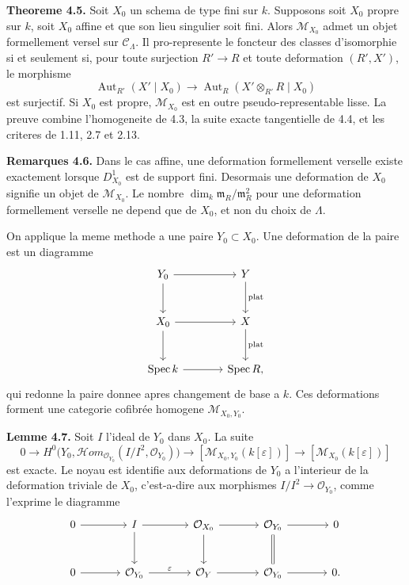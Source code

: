 \documentclass[11pt]{article}
\providecommand{\Spec}{\operatorname{Spec}}
\providecommand{\Aut}{\operatorname{Aut}}
\begin{document}
\textbf{Theoreme 4.5.} Soit \(X_0\) un schema de type fini sur \(k\). Supposons soit \(X_0\) propre sur \(k\), soit \(X_0\) affine et que son lieu singulier soit fini. Alors \(\mathcal M_{X_0}\) admet un objet formellement versel sur \(\mathcal C_\Lambda\). Il pro-represente le foncteur des classes d'isomorphie si et seulement si, pour toute surjection \(R'\to R\) et toute deformation \((R',X')\), le morphisme
\[
 \Aut_{R'}(X'\mid X_0)\to \Aut_R(X'\otimes_{R'}R\mid X_0)
\]
est surjectif. Si \(X_0\) est propre, \(\mathcal M_{X_0}\) est en outre pseudo-representable lisse. La preuve combine l'homogeneite de 4.3, la suite exacte tangentielle de 4.4, et les criteres de 1.11, 2.7 et 2.13.

\textbf{Remarques 4.6.} Dans le cas affine, une deformation formellement verselle existe exactement lorsque \(D^1_{X_0}\) est de support fini. Desormais une deformation de \(X_0\) signifie un objet de \(\mathcal M_{X_0}\). Le nombre \(\dim_k\mathfrak m_R/\mathfrak m_R^2\) pour une deformation formellement verselle ne depend que de \(X_0\), et non du choix de \(\Lambda\).

On applique la meme methode a une paire \(Y_0\subset X_0\). Une deformation de la paire est un diagramme
\[
\begin{tikzcd}[column sep=large,row sep=large]
 Y_0 \arrow[r] \arrow[d] & Y \arrow[d,"\mathrm{plat}"]\\
 X_0 \arrow[r] \arrow[d] & X \arrow[d,"\mathrm{plat}"]\\
 \Spec k \arrow[r] & \Spec R,
\end{tikzcd}
\]
qui redonne la paire donnee apres changement de base a \(k\). Ces deformations forment une categorie cofibrée homogene \(\mathcal M_{X_0,Y_0}\).

\textbf{Lemme 4.7.} Soit \(I\) l'ideal de \(Y_0\) dans \(X_0\). La suite
\[
0\to H^0\bigl(Y_0,\mathcal Hom_{\mathcal O_{Y_0}}(I/I^2,\mathcal O_{Y_0})\bigr)
\to [\mathcal M_{X_0,Y_0}(k[\varepsilon])]
\to [\mathcal M_{X_0}(k[\varepsilon])]
\]
est exacte. Le noyau est identifie aux deformations de \(Y_0\) a l'interieur de la deformation triviale de \(X_0\), c'est-a-dire aux morphismes \(I/I^2\to\mathcal O_{Y_0}\), comme l'exprime le diagramme
\[
\begin{tikzcd}[column sep=large,row sep=large]
 0 \arrow[r] & I \arrow[r] \arrow[d] & \mathcal O_{X_0} \arrow[r] \arrow[d] & \mathcal O_{Y_0} \arrow[r] \arrow[d,equal] & 0\\
 0 \arrow[r] & \mathcal O_{Y_0} \arrow[r,"\varepsilon"] & \mathcal O_Y \arrow[r] & \mathcal O_{Y_0} \arrow[r] & 0.
\end{tikzcd}
\]
\end{document}
